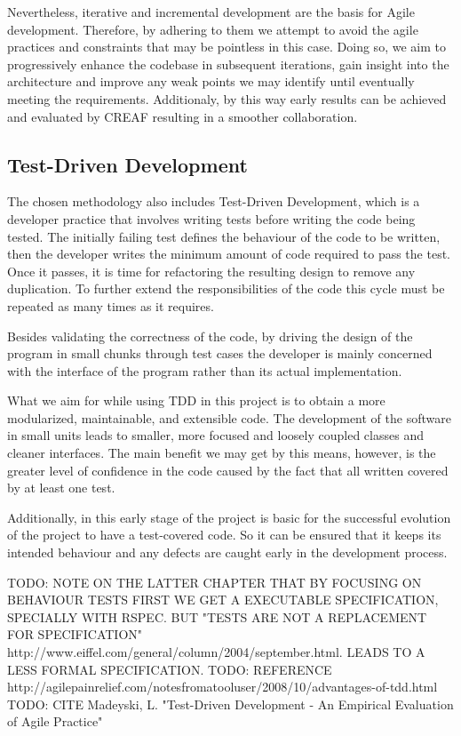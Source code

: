 Nevertheless, iterative and incremental development are the basis for Agile development. Therefore, by adhering to them we attempt to avoid the agile practices and constraints that may be pointless in this case. Doing so, we aim to progressively enhance the codebase in subsequent iterations, gain insight into the architecture and improve any weak points we may identify until eventually meeting the requirements. Additionaly, by this way early results can be achieved and evaluated by CREAF resulting in a smoother collaboration.

\subsection{Test-Driven Development}

The chosen methodology also includes Test-Driven Development, which is a developer practice that involves writing tests before writing the code being tested. The initially failing test defines the behaviour of the code to be written, then the developer writes the minimum amount of code required to pass the test. Once it passes, it is time for refactoring the resulting design to remove any duplication. To further extend the responsibilities of the code this cycle must be repeated as many times as it requires.

Besides validating the correctness of the code, by driving the design of the program in small chunks through test cases the developer is mainly concerned with the interface of the program rather than its actual implementation.

What we aim for while using TDD in this project is to obtain a more modularized, maintainable, and extensible code. The development of the software in small units leads to smaller, more focused and loosely coupled classes and cleaner interfaces. The main benefit we may get by this means, however, is the greater level of confidence in the code caused by the fact that all written covered by at least one test.

Additionally, in this early stage of the project is basic for the successful evolution of the project to have a test-covered code. So it can be ensured that it keeps its intended behaviour and any defects are caught early in the development process.

TODO: NOTE ON THE LATTER CHAPTER THAT BY FOCUSING ON BEHAVIOUR TESTS FIRST WE GET A EXECUTABLE SPECIFICATION, SPECIALLY WITH RSPEC. BUT "TESTS ARE NOT A REPLACEMENT FOR SPECIFICATION" http://www.eiffel.com/general/column/2004/september.html. LEADS TO A LESS FORMAL SPECIFICATION.
TODO: REFERENCE http://agilepainrelief.com/notesfromatooluser/2008/10/advantages-of-tdd.html
TODO: CITE Madeyski, L. "Test-Driven Development - An Empirical Evaluation of Agile Practice"
